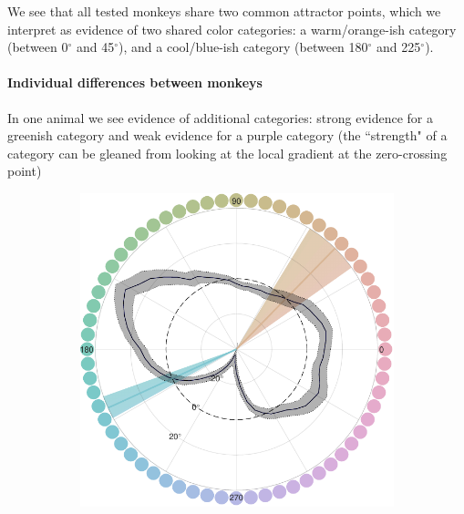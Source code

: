 We see that all tested monkeys share two common attractor points, which we interpret as evidence of two shared color categories: a warm/orange-ish category (between 0$^\circ$ and 45$^\circ$), and a cool/blue-ish category (between 180$^\circ$ and 225$^\circ$).

\paragraph{Individual differences between monkeys}

In one animal we see evidence of additional categories: strong evidence for a greenish category and weak evidence for a purple category (the ``strength" of a category can be gleaned from looking at the local gradient at the zero-crossing point)

\begin{figure}
    \centering
    \begin{subfigure}[b]{0.49\textwidth}
         \centering
         \caption{}
         \includegraphics[width=\textwidth]{../../../Analyses/211012_124119_Pollux/210422--211012_Pollux_categorybias2_230225.pdf}
         \label{fig:BiasCurvesPollux}
    \end{subfigure}
    \hfill
    \begin{subfigure}[b]{0.49\textwidth}
         \centering
         \caption{}

\end{subfigure}
\end{figure}

